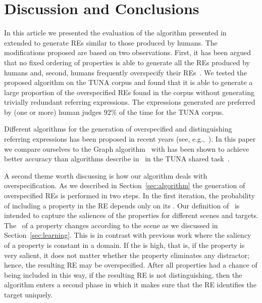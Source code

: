 \section{Discussion and Conclusions} 
\label{sec:discussion}

In this article we presented the evaluation of the algorithm presented in~\cite{arec2:2008:Areces} extended to generate REs similar to those produced by humans. The modifications proposed are based on two observations. First, it has been argued that no fixed ordering of properties is able to generate all the REs produced by humans and, second, humans frequently overspecify their REs~\cite{Engelhardt_Bailey_Ferreira_2006,Arts_Maes_Noordman_Jansen_2011}. 
We tested the proposed algorithm on the TUNA corpus and found that it is able to generate a large proportion of the overspecified REs found in the corpus without generating trivially redundant referring expressions. The expressions generated are preferred by (one or more) human judges 92\% of the time for the TUNA corpus. 


Different algorithms for the generation of overspecified and distinguishing referring expressions has been proposed in recent years 
(see, e.g.,~\cite{delucena-paraboni:2008:ENLG,ruud-emiel-mariet:2012:INLG2012}). In this paper we compare ourselves to the Graph algorithm~\cite{KrahmerGRAPH} with has been shown to achieve better accuracy than algorithms describe in~\cite{delucena-paraboni:2008:ENLG,ruud-emiel-mariet:2012:INLG2012} in the TUNA shared task~\cite{gatt-balz-kow:2008:ENLG}. 

A second theme worth discussing is how our algorithm deals with overspecification. As we described in Section~\ref{sec:algorithm} the generation of overspecified REs is performed in two steps. In the first iteration, the probability of including a property in the RE depends only on its \puse. Our definition of \puse\ is intended to capture the saliences of the properties for different scenes and targets. The \puse\ of a property changes according to the scene as we discussed in Section~\ref{sec:learning}. This is in contrast with previous work where the saliency of a property is constant in a domain. If the \puse is high, that is, if the property is very salient, it does not matter whether the property  eliminates any distractor; hence, the resulting RE may be overspecified. After all properties had a chance of being included in this way, if the resulting RE is not distinguishing, then the algorithm enters a second phase in which it makes sure that the RE identifies the target uniquely.  

